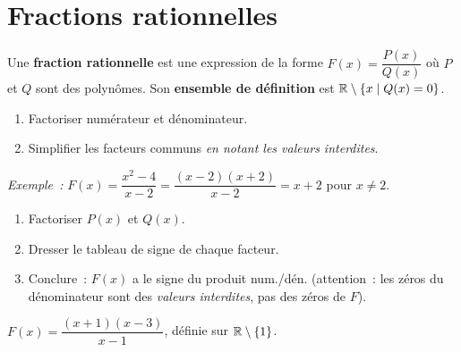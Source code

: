 \section{Fractions rationnelles}

\begin{defn}
Une \textbf{fraction rationnelle} est une expression de la forme
$F(x) = \dfrac{P(x)}{Q(x)}$ o\`u $P$ et $Q$ sont des polyn\^omes.
Son \textbf{ensemble de d\'efinition} est $\mathbb{R} \setminus \{x \mid Q(x)=0\}$.
\end{defn}

\begin{methode}
\begin{enumerate}
  \item Factoriser num\'erateur et d\'enominateur.
  \item Simplifier les facteurs communs \emph{en notant les valeurs interdites}.
\end{enumerate}
\emph{Exemple~:} $F(x) = \dfrac{x^2-4}{x-2} = \dfrac{(x-2)(x+2)}{x-2} = x+2$
pour $x \ne 2$.
\end{methode}

\begin{methode}
\begin{enumerate}
  \item Factoriser $P(x)$ et $Q(x)$.
  \item Dresser le tableau de signe de chaque facteur.
  \item Conclure~: $F(x)$ a le signe du produit num./d\'en.
        (attention~: les z\'eros du d\'enominateur sont des \emph{valeurs interdites},
        pas des z\'eros de $F$).
\end{enumerate}
\end{methode}

\begin{ex}
$F(x) = \dfrac{(x+1)(x-3)}{x-1}$, d\'efinie sur $\mathbb{R}\setminus\{1\}$.
\begin{center}
\end{center}
\end{ex}

